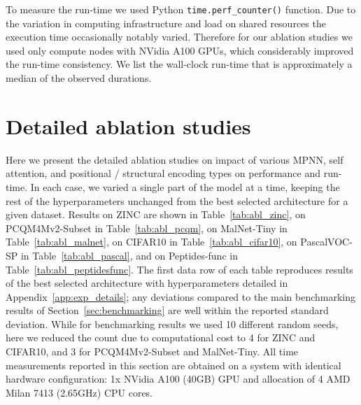 \documentclass{article}
\begin{document}
To measure the run-time we used Python \verb|time.perf_counter()| function. Due to the variation in computing infrastructure and load on shared resources the execution time occasionally notably varied. Therefore for our ablation studies we used only compute nodes with NVidia A100 GPUs, which considerably improved the run-time consistency. We list the wall-clock run-time that is approximately a median of the observed durations.


\newpage
\section{Detailed ablation studies}\label{app:exp_ablations}
\setcounter{figure}{0}
\setcounter{table}{0}
Here we present the detailed ablation studies on impact of various MPNN, self attention, and positional / structural encoding types on \method performance and run-time. In each case, we varied a single part of the model at a time, keeping the rest of the \method hyperparameters unchanged from the best selected architecture for a given dataset. Results on ZINC are shown in Table~\ref{tab:abl_zinc}, on PCQM4Mv2-Subset in Table~\ref{tab:abl_pcqm}, on MalNet-Tiny in Table~\ref{tab:abl_malnet}, on CIFAR10 in Table~\ref{tab:abl_cifar10}, on PascalVOC-SP in Table~\ref{tab:abl_pascal}, and on Peptides-func in Table~\ref{tab:abl_peptidesfunc}. The first data row of each table reproduces results of the best selected architecture with hyperparameters detailed in Appendix~\ref{app:exp_details}; any deviations compared to the main benchmarking results of Section~\ref{sec:benchmarking} are well within the reported standard deviation. While for benchmarking results we used 10 different random seeds, here we reduced the count due to computational cost to 4 for ZINC and CIFAR10, and 3 for PCQM4Mv2-Subset and MalNet-Tiny. All time measurements reported in this section are obtained on a system with identical hardware configuration: 1x NVidia A100 (40GB) GPU and allocation of 4 AMD Milan 7413 (2.65GHz) CPU cores.
\end{document}
